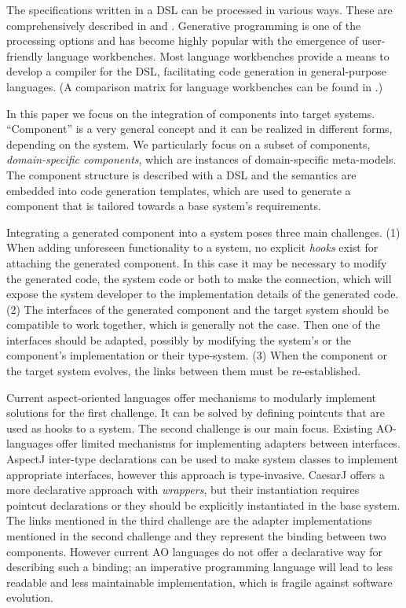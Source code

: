 \documentclass{llncs}
\begin{document}
The specifications written in a DSL can be processed in various ways. These are
comprehensively described in \cite{Mernik:whenandhow} and
\cite{fowler2010domain}. Generative programming \cite{Czarnecki:overview} is one
of the processing options and has become highly popular with the emergence of
user-friendly language workbenches. Most language workbenches provide a means
to develop a compiler for the DSL, facilitating code generation in general-purpose
languages. (A comparison matrix for language workbenches can be found in
\cite{LWC}.) 

In this paper we focus on the integration of components into target systems.
``Component'' is a very general concept and it can be realized in different forms,
depending on the system. We particularly focus on a subset of components,
\emph{domain-specific components}, which are instances of domain-specific meta-models.
The component structure is described with a DSL and the semantics are embedded
into code generation templates, which are used to generate a component that is tailored towards a base system's requirements.
  

Integrating a generated component into a system poses three main challenges.
(1) When adding unforeseen functionality to a
system, no explicit \emph{hooks} exist for attaching the
generated component. In this case it may be necessary to modify the
generated code, the system code or both to make the connection, which will
expose the system developer to the implementation details of the generated code.
(2) The interfaces of the generated component and the target system should be compatible to work together, which is generally not the case. Then one of the interfaces should be adapted, possibly by modifying the system's or the component's implementation or their type-system.
(3) When the component or the target system evolves, the links between them
must be re-established. 



Current aspect-oriented languages offer mechanisms to modularly implement solutions for the first challenge. It can be solved by defining pointcuts that are used as hooks to a system. The second challenge is our main focus. Existing AO-languages offer limited mechanisms for implementing adapters between interfaces. AspectJ inter-type declarations can be used to make system classes to implement appropriate interfaces, however this approach is type-invasive. CaesarJ offers a more declarative approach with \emph{wrappers}, but their instantiation requires pointcut declarations or they should be explicitly instantiated in the base system. The links mentioned in the third challenge  are the adapter implementations mentioned in the second challenge and they represent the binding between two components. However current AO languages do not offer a declarative way for describing such a binding; an imperative programming language will lead to less readable and less maintainable implementation, which is fragile against software evolution.
\end{document}
